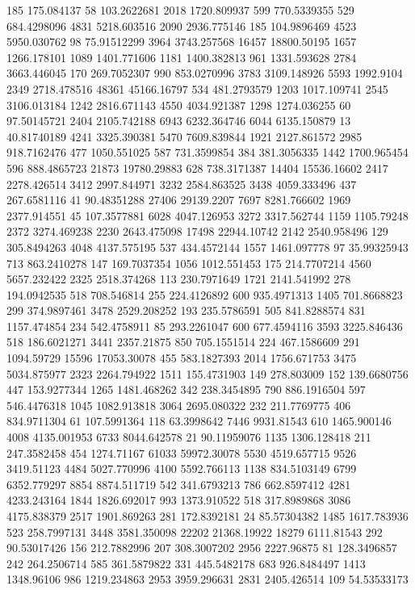 185	175.084137
58	103.2622681
2018	1720.809937
599	770.5339355
529	684.4298096
4831	5218.603516
2090	2936.775146
185	104.9896469
4523	5950.030762
98	75.91512299
3964	3743.257568
16457	18800.50195
1657	1266.178101
1089	1401.771606
1181	1400.382813
961	1331.593628
2784	3663.446045
170	269.7052307
990	853.0270996
3783	3109.148926
5593	1992.9104
2349	2718.478516
48361	45166.16797
534	481.2793579
1203	1017.109741
2545	3106.013184
1242	2816.671143
4550	4034.921387
1298	1274.036255
60	97.50145721
2404	2105.742188
6943	6232.364746
6044	6135.150879
13	40.81740189
4241	3325.390381
5470	7609.839844
1921	2127.861572
2985	918.7162476
477	1050.551025
587	731.3599854
384	381.3056335
1442	1700.965454
596	888.4865723
21873	19780.29883
628	738.3171387
14404	15536.16602
2417	2278.426514
3412	2997.844971
3232	2584.863525
3438	4059.333496
437	267.6581116
41	90.48351288
27406	29139.2207
7697	8281.766602
1969	2377.914551
45	107.3577881
6028	4047.126953
3272	3317.562744
1159	1105.79248
2372	3274.469238
2230	2643.475098
17498	22944.10742
2142	2540.958496
129	305.8494263
4048	4137.575195
537	434.4572144
1557	1461.097778
97	35.99325943
713	863.2410278
147	169.7037354
1056	1012.551453
175	214.7707214
4560	5657.232422
2325	2518.374268
113	230.7971649
1721	2141.541992
278	194.0942535
518	708.546814
255	224.4126892
600	935.4971313
1405	701.8668823
299	374.9897461
3478	2529.208252
193	235.5786591
505	841.8288574
831	1157.474854
234	542.4758911
85	293.2261047
600	677.4594116
3593	3225.846436
518	186.6021271
3441	2357.21875
850	705.1551514
224	467.1586609
291	1094.59729
15596	17053.30078
455	583.1827393
2014	1756.671753
3475	5034.875977
2323	2264.794922
1511	155.4731903
149	278.803009
152	139.6680756
447	153.9277344
1265	1481.468262
342	238.3454895
790	886.1916504
597	546.4476318
1045	1082.913818
3064	2695.080322
232	211.7769775
406	834.9711304
61	107.5991364
118	63.3998642
7446	9931.81543
610	1465.900146
4008	4135.001953
6733	8044.642578
21	90.11959076
1135	1306.128418
211	247.3582458
454	1274.71167
61033	59972.30078
5530	4519.657715
9526	3419.51123
4484	5027.770996
4100	5592.766113
1138	834.5103149
6799	6352.779297
8854	8874.511719
542	341.6793213
786	662.8597412
4281	4233.243164
1844	1826.692017
993	1373.910522
518	317.8989868
3086	4175.838379
2517	1901.869263
281	172.8392181
24	85.57304382
1485	1617.783936
523	258.7997131
3448	3581.350098
22202	21368.19922
18279	6111.81543
292	90.53017426
156	212.7882996
207	308.3007202
2956	2227.96875
81	128.3496857
242	264.2506714
585	361.5879822
331	445.5482178
683	926.8484497
1413	1348.96106
986	1219.234863
2953	3959.296631
2831	2405.426514
109	54.53533173
